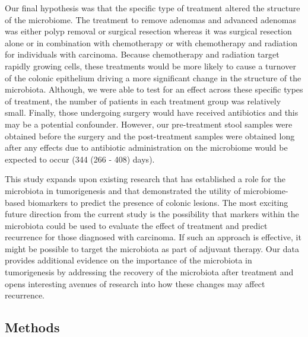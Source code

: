 \documentclass[12pt,]{article}
\begin{document}
Our final hypothesis was that the specific type of treatment altered the
structure of the microbiome. The treatment to remove adenomas and
advanced adenomas was either polyp removal or surgical resection whereas
it was surgical resection alone or in combination with chemotherapy or
with chemotherapy and radiation for individuals with carcinoma. Because
chemotherapy and radiation target rapidly growing cells, these
treatments would be more likely to cause a turnover of the colonic
epithelium driving a more significant change in the structure of the
microbiota. Although, we were able to test for an effect across these
specific types of treatment, the number of patients in each treatment
group was relatively small. Finally, those undergoing surgery would have
received antibiotics and this may be a potential confounder. However,
our pre-treatment stool samples were obtained before the surgery and the
post-treatment samples were obtained long after any effects due to
antibiotic administration on the microbiome would be expected to occur
(344 (266 - 408) days).

This study expands upon existing research that has established a role
for the microbiota in tumorigenesis and that demonstrated the utility of
microbiome-based biomarkers to predict the presence of colonic lesions.
The most exciting future direction from the current study is the
possibility that markers within the microbiota could be used to evaluate
the effect of treatment and predict recurrence for those diagnosed with
carcinoma. If such an approach is effective, it might be possible to
target the microbiota as part of adjuvant therapy. Our data provides
additional evidence on the importance of the microbiota in tumorigenesis
by addressing the recovery of the microbiota after treatment and opens
interesting avenues of research into how these changes may affect
recurrence.

\newpage

\subsection{Methods}\label{methods}
\end{document}
